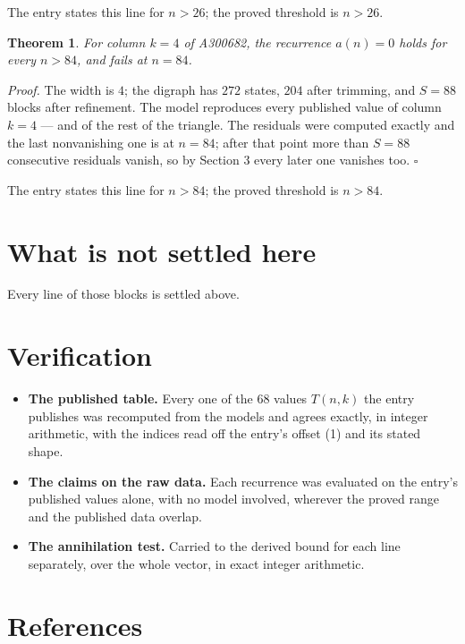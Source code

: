 \documentclass[11pt]{article}
\newtheorem{theorem}{Theorem}
\theoremstyle{definition}
\begin{document}
The entry states this line for $n > 26$; the proved threshold is $n > 26$.

\begin{theorem} For column $k = 4$ of A300682, the recurrence $a(n) = 0$ holds for every $n > 84$, and fails at $n = 84$.\end{theorem}

{\itshape Proof.} The width is $4$; the digraph has $272$ states, $204$ after trimming, and $S = 88$ blocks after refinement. The model reproduces every published value of column $k = 4$ --- and of the rest of the triangle. The residuals were computed exactly and the last nonvanishing one is at $n = 84$; after that point more than $S = 88$ consecutive residuals vanish, so by Section 3 every later one vanishes too. $\square$

The entry states this line for $n > 84$; the proved threshold is $n > 84$.

\section{What is not settled here}

Every line of those blocks is settled above.

\section{Verification}

\begin{itemize}

\item {\bfseries The published table.} Every one of the 68 values $T(n,k)$ the entry publishes was recomputed from the models and agrees exactly, in integer arithmetic, with the indices read off the entry's offset (1) and its stated shape.

\item {\bfseries The claims on the raw data.} Each recurrence was evaluated on the entry's published values alone, with no model involved, wherever the proved range and the published data overlap.

\item {\bfseries The annihilation test.} Carried to the derived bound for each line separately, over the whole vector, in exact integer arithmetic.

\end{itemize}

\section{References}
\end{document}
